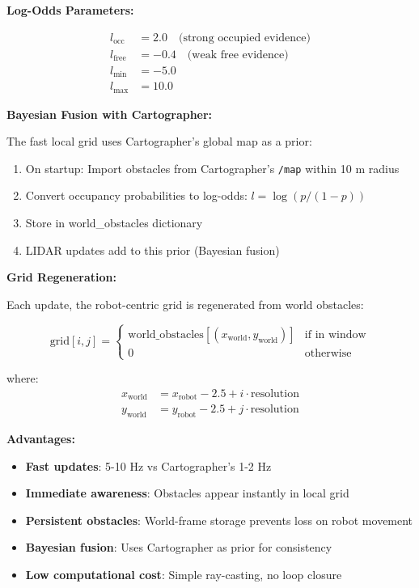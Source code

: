 \documentclass[11pt]{article}
\begin{document}
\textbf{Log-Odds Parameters:}

\begin{align}
l_{\text{occ}} &= 2.0 \quad \text{(strong occupied evidence)} \\
l_{\text{free}} &= -0.4 \quad \text{(weak free evidence)} \\
l_{\min} &= -5.0 \\
l_{\max} &= 10.0
\end{align}

\textbf{Bayesian Fusion with Cartographer:}

The fast local grid uses Cartographer's global map as a prior:

\begin{enumerate}
    \item On startup: Import obstacles from Cartographer's \texttt{/map} within 10 m radius
    \item Convert occupancy probabilities to log-odds: $l = \log(p / (1-p))$
    \item Store in world\_obstacles dictionary
    \item LIDAR updates add to this prior (Bayesian fusion)
\end{enumerate}

\textbf{Grid Regeneration:}

Each update, the robot-centric grid is regenerated from world obstacles:

\[
\text{grid}[i, j] = \begin{cases}
\text{world\_obstacles}[(x_{\text{world}}, y_{\text{world}})] & \text{if in window} \\
0 & \text{otherwise}
\end{cases}
\]

where:
\begin{align}
x_{\text{world}} &= x_{\text{robot}} - 2.5 + i \cdot \text{resolution} \\
y_{\text{world}} &= y_{\text{robot}} - 2.5 + j \cdot \text{resolution}
\end{align}

\textbf{Advantages:}

\begin{itemize}
    \item \textbf{Fast updates}: 5-10 Hz vs Cartographer's 1-2 Hz
    \item \textbf{Immediate awareness}: Obstacles appear instantly in local grid
    \item \textbf{Persistent obstacles}: World-frame storage prevents loss on robot movement
    \item \textbf{Bayesian fusion}: Uses Cartographer as prior for consistency
    \item \textbf{Low computational cost}: Simple ray-casting, no loop closure
\end{itemize}
\end{document}
